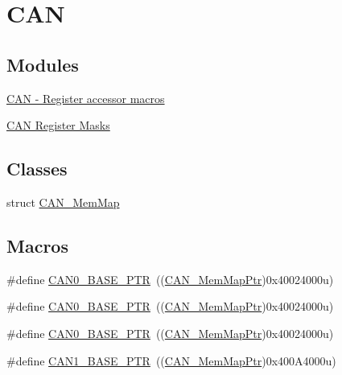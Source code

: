 \hypertarget{group___c_a_n___peripheral}{}\section{C\+AN}
\label{group___c_a_n___peripheral}
\subsection*{Modules}
\begin{DoxyCompactItemize}
\item 
\hyperlink{group___c_a_n___register___accessor___macros}{C\+A\+N -\/ Register accessor macros}
\item 
\hyperlink{group___c_a_n___register___masks}{C\+A\+N Register Masks}
\end{DoxyCompactItemize}
\subsection*{Classes}
\begin{DoxyCompactItemize}
\item 
struct \hyperlink{struct_c_a_n___mem_map}{C\+A\+N\+\_\+\+Mem\+Map}
\end{DoxyCompactItemize}
\subsection*{Macros}
\begin{DoxyCompactItemize}
\item 
\#define \hyperlink{group___c_a_n___peripheral_ga1ee8f499e10af9b8e3132e0168e519b9}{C\+A\+N0\+\_\+\+B\+A\+S\+E\+\_\+\+P\+TR}~((\hyperlink{group___c_a_n___peripheral_gadc219505f1f3c5212d1e670b3d57d9b6}{C\+A\+N\+\_\+\+Mem\+Map\+Ptr})0x40024000u)
\item 
\#define \hyperlink{group___c_a_n___peripheral_ga1ee8f499e10af9b8e3132e0168e519b9}{C\+A\+N0\+\_\+\+B\+A\+S\+E\+\_\+\+P\+TR}~((\hyperlink{group___c_a_n___peripheral_gadc219505f1f3c5212d1e670b3d57d9b6}{C\+A\+N\+\_\+\+Mem\+Map\+Ptr})0x40024000u)
\item 
\#define \hyperlink{group___c_a_n___peripheral_ga1ee8f499e10af9b8e3132e0168e519b9}{C\+A\+N0\+\_\+\+B\+A\+S\+E\+\_\+\+P\+TR}~((\hyperlink{group___c_a_n___peripheral_gadc219505f1f3c5212d1e670b3d57d9b6}{C\+A\+N\+\_\+\+Mem\+Map\+Ptr})0x40024000u)
\item 
\#define \hyperlink{group___c_a_n___peripheral_ga810387eeeb9ccd0e09ae057ff6f0d2ca}{C\+A\+N1\+\_\+\+B\+A\+S\+E\+\_\+\+P\+TR}~((\hyperlink{group___c_a_n___peripheral_gadc219505f1f3c5212d1e670b3d57d9b6}{C\+A\+N\+\_\+\+Mem\+Map\+Ptr})0x400\+A4000u)
\end{DoxyCompactItemize}
